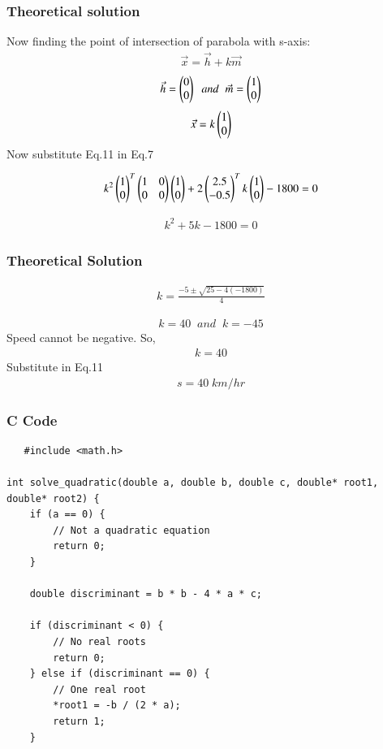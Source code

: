 \documentclass{beamer}
\begin{document}
    \begin{frame}
    \frametitle{Theoretical solution}
   Now finding the point of intersection of parabola with s-axis:
\begin{align}
    \Vec{x}=\Vec{h}+k\Vec{m}
\end{align}
\begin{align}
    \Vec{h}=\begin{pmatrix}0\\0\end{pmatrix}\;\;and\;\;\Vec{m}=\begin{pmatrix}1\\0\end{pmatrix}
\end{align}
\begin{align}
    \Vec{x}=k\begin{pmatrix}1\\0\end{pmatrix}
\end{align}
Now substitute Eq.11 in Eq.7

\begin{align}
k^2\begin{pmatrix}1\\0\end{pmatrix}^T\begin{pmatrix}1&0\\0&0\end{pmatrix}\begin{pmatrix}1\\0\end{pmatrix}+2\begin{pmatrix}2.5\\-0.5\end{pmatrix}^Tk\begin{pmatrix}1\\0\end{pmatrix}-1800=0
\end{align}

\begin{align}
  k^2+5k-1800=0
\end{align}


    \end{frame}
    
    \begin{frame}
    \frametitle{Theoretical Solution}
    \begin{align}
   k=\frac{-5\pm \sqrt{25-4(-1800)}}{4}
\end{align}

\begin{align}
    k=40\;\;and \;\;k=-45
\end{align}
Speed cannot be negative. So,
\begin{align}
    k=40
\end{align}
Substitute in Eq.11
\begin{align}
   s=40\;km/hr
\end{align}
    \end{frame}
    
   
    \begin{frame}[fragile]
        \frametitle{C Code}
        \begin{lstlisting}
   #include <math.h>

int solve_quadratic(double a, double b, double c, double* root1, double* root2) {
    if (a == 0) {
        // Not a quadratic equation
        return 0;
    }

    double discriminant = b * b - 4 * a * c;

    if (discriminant < 0) {
        // No real roots
        return 0;
    } else if (discriminant == 0) {
        // One real root
        *root1 = -b / (2 * a);
        return 1;
    } 

        \end{lstlisting}
    \end{frame}
    
\end{document}
